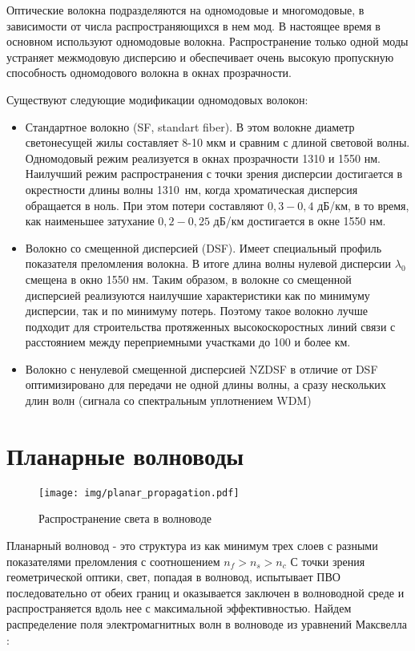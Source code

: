 Оптические волокна подразделяются на одномодовые и многомодовые, в зависимости от числа распространяющихся в нем мод. В настоящее время в основном используют одномодовые волокна. Распространение только одной моды устраняет межмодовую дисперсию и обеспечивает  очень  высокую  пропускную  способность  одномодового  волокна  в окнах  прозрачности.

Существуют следующие модификации одномодовых волокон:
\begin{itemize}
\item Стандартное  волокно (SF, standart fiber). В этом волокне диаметр светонесущей жилы составляет 8-10 мкм и сравним с длиной световой волны. Одномодовый  режим  реализуется  в  окнах  прозрачности 1310 и 1550 нм. Наилучший  режим  распространения  с точки зрения дисперсии достигается  в  окрестности  длины  волны 1310~нм,  когда  хроматическая  дисперсия обращается в ноль. При этом потери составляют $0,3-0,4$ дБ/км,  в  то  время,  как  наименьшее  затухание $0,2-0,25$ дБ/км достигается в окне 1550 нм. 
\item Волокно со смещенной дисперсией (DSF). Имеет специальный профиль показателя преломления волокна. В итоге длина  волны  нулевой  дисперсии $\lambda_0$ смещена в окно 1550 нм. Таким  образом,  в  волокне  со  смещенной дисперсией реализуются наилучшие характеристики как по минимуму дисперсии, так и по минимуму  потерь.  Поэтому  такое  волокно  лучше  подходит  для  строительства протяженных  высокоскоростных  линий  связи  с  расстоянием  между  переприемными участками до 100 и более км. 
\item Волокно  с  ненулевой  смещенной  дисперсией NZDSF  в  отличие  от DSF 
оптимизировано  для  передачи  не  одной  длины  волны,  а  сразу  нескольких  длин  волн 
(сигнала  со  спектральным  уплотнением WDM) 
\end{itemize}    

\section{Планарные волноводы}

\begin{figure}[h!]
\texttt{[image: img/planar\_propagation.pdf]}
\caption{Распространение света в волноводе}
\end{figure}

Планарный волновод - это структура из как минимум трех слоев с разными показателями преломления с соотношением $n_f > n_s > n_c$ С точки зрения геометрической оптики, свет, попадая в волновод, испытывает ПВО последовательно от обеих границ и оказывается заключен в волноводной среде и распространяется вдоль нее с максимальной эффективностью. Найдем распределение поля электромагнитных волн в волноводе из уравнений Максвелла \cite{adams}:

